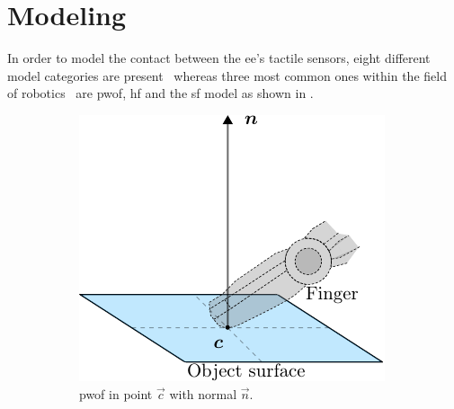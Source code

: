 
\chapter{Modeling} \label{ch:modeling}

In order to model the contact between the \gls{ee}'s tactile sensors, eight different model categories are present~\cite{articulated-hands-force-control-and-kinematic-issues} whereas three most common ones within the field of robotics~\cite[Chapter 37]{handbook-of-robotics} are \gls{pwof}, \gls{hf} and the \gls{sf} model as shown in . \medskip

\begin{figure}[h]
	\centering
	\begin{subfigure}[b]{0.3\textwidth}
		\centering
		\includegraphics[width=\textwidth]{chapters/modeling/fig/contact-no-friction-crop.pdf}
		\caption{\gls{pwof} in point $\vec{c}$ with normal $\vec{n}$. \\\hspace{\textwidth} }
		\label{fig:pwof}
	\end{subfigure}
	\hfill
	\begin{subfigure}[b]{0.3\textwidth}
		\centering

\end{subfigure}
\end{figure}
